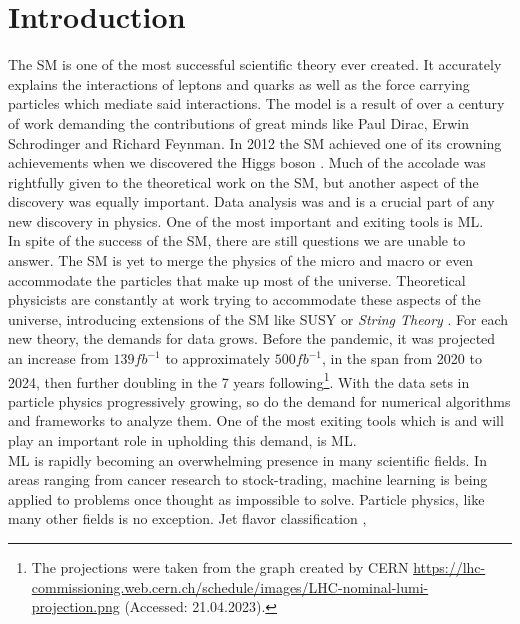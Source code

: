 \chapter*{Introduction}
The \ac{SM} is one of the most successful scientific theory ever
created. It accurately explains the interactions of leptons and quarks as well as the force
carrying particles which mediate said interactions. The model is a result of over a century of work
demanding the contributions of great minds like Paul Dirac, Erwin Schrodinger and Richard Feynman.
In 2012 the SM achieved one of its crowning achievements when we discovered the Higgs boson \cite{Aad_2012}. 
Much of the accolade was rightfully given to the theoretical work on the \ac{SM}, but another aspect of the discovery 
was equally important. Data analysis was and is a crucial part of any new discovery in physics. One of the most important 
and exiting tools is \ac{ML}.\newline
\\
In spite of the success of the \ac{SM}, there are still questions we are unable to answer.
The \ac{SM} is yet to merge the physics of the micro and macro or even accommodate the particles that make
up most of the universe. Theoretical physicists are constantly at work trying to accommodate these aspects of the universe,
introducing extensions of the \ac{SM} like \ac{SUSY} \cite{SUSY} or \emph{String Theory} \cite{cole_probing_2021}. For each new theory, 
the demands for data grows. Before the pandemic, it was projected an increase from $139fb^{-1}$ to approximately $500fb^{-1}$, in the span from 
2020 to 2024, then further doubling in the 7 years following\footnote{The projections were taken from the graph created by CERN
\href{https://lhc-commissioning.web.cern.ch/schedule/images/LHC-nominal-lumi-projection.png}{https://lhc-commissioning.web.cern.ch/schedule/images/LHC-nominal-lumi-projection.png}
(Accessed: 21.04.2023).}. With the data sets in particle physics progressively growing, so do the demand for numerical algorithms and frameworks to analyze them.
One of the most exiting tools which is and will play an important role in upholding this demand, is \ac{ML}.\newline
\\
\acf{ML} is rapidly becoming an overwhelming presence in many scientific fields.
In areas ranging from cancer research to stock-trading, machine learning is being applied to problems
once thought as impossible to solve. Particle physics, like many other fields is no exception. Jet flavor classification \cite{Guest_2016}, 
